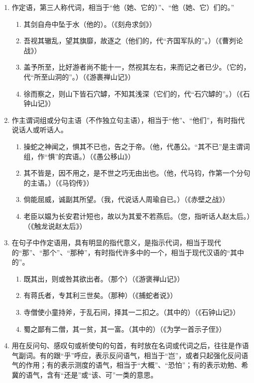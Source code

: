 \noindent
[\ 其\ ]
\begin{enumerate}[label=(\arabic*)]
	\item 作定语，第三人称代词，相当于“他（她、它的）”、“他（她、它）们的。”
	\begin{enumerate}[label=\textcircled{\arabic*}]
		\item 其剑自舟中坠于水（他的）。（《刻舟求剑》）
		\item 吾视其辙乱，望其旗靡，故逐之（他们的，代“齐国军队的”。）（《曹刿论战》）
		\item 盖予所至，比好游者尚不能十一，然视其左右，来而记之者已少。（它的，代“所至山洞的”。）（《游裹禅山记》）
		\item 徐而察之，则山下皆石穴罅，不知其浅深（它们的，代“石穴罅的”。）（《石钟山记》）
	\end{enumerate}
	\newpage
	\item 作主谓词组或分句主语（不作独立句主语），相当于“他”、“他们”，有时指代说话人或听话人。
	\begin{enumerate}[label=\textcircled{\arabic*}]
		\item 操蛇之神闻之，惧其不已也，告之于帝。（他，代愚公。“其不已”是主谓词组，作“惧”的宾语。）（《愚公移山》）
		\item 其不皆是，因不用之，是不世之巧无由出也。（他，代马钧，作第一个分句的主语。）（《马钧传》）
		\item 倘能屈威，诚副其所望。（我，代说话人周瑜自已。）（《赤壁之战》）
		\item 老臣以媪为长安君计短也，故以为其爱不若燕后。（您，指听话人赵太后。）（《触龙说赵太后》）
	\end{enumerate}
	\item 在句子中作定语用，具有明显的指代意义，是指示代词，相当于现代的“那”、“那个”、“那种”，有时指代许多中的一个，相当于现代汉语的“其中的”。
	\begin{enumerate}[label=\textcircled{\arabic*}]
		\item 既其出，则或咎其欲出者。（那个）（《游褒禅山记》）
		\item 有蒋氏者，专其利三世矣。（那种）（《捕蛇者说》）
		\item 寺僧使小童持斧，于乱石间，择其一二扣之。（其中的）（《石钟山记》）
		\item 蜀之鄙有二僧，其一贫，其一富。（其中的）（《为学一首示子侄》）
	\end{enumerate}
	\newpage
	\item 用在反问句、感叹句或祈使句的句首，有时放在名词或代词之后，往往是作语气副词。有的跟“乎”呼应，表示反问语气，相当于“岂”，或者只起强化反问语气的作用；有的表示测度的语气，相当于“大概”、“恐怕”；有的表示劝勉、希冀的语气，含有“还是”或“该、可”一类的意思。

\end{enumerate}
